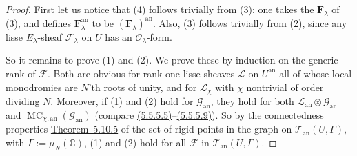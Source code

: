 \begin{proof}
First let us notice that (4) follows trivially from (3): one takes the
\(\mathbf{F}_\lambda\) of (3), and defines \(\mathbf{F}^{\mathrm{an}}_\lambda\)
to be \((\mathbf{F}_\lambda)^{\mathrm{an}}\). Also, (3) follows trivially from
(2), since any lisse \(E_\lambda\)-sheaf \(\mathcal{F}_\lambda\) on \(U\) has
an \(\mathcal{O}_\lambda\)-form.

So it remains to prove (1) and (2). We prove these by induction on the generic
rank of \(\mathcal{F}\). Both are obvious for rank one lisse sheaves
\(\mathcal{L}\) on \(U^{\mathrm{an}}\) all of whose local monodromies are
\(N\)'th roots of unity, and for \(\mathcal{L}_\chi\) with \(\chi\) nontrivial
of order dividing \(N\). Moreover, if (1) and (2) hold for
\(\mathcal{G}_{\mathrm{an}}\), they hold for both
\(\mathcal{L}_{\mathrm{an}}\otimes\mathcal{G}_{\mathrm{an}}\) and
\(\operatorname{MC}_{\chi,\mathrm{an}}(\mathcal{G}_{\mathrm{an}})\) (compare
\hyperref[par:5.5.5.5]{(5.5.5.5)}--\hyperref[par:5.5.5.9]{(5.5.5.9)}). So
by the connectedness properties
\hyperref[thm:5.10.5]{Theorem~5.10.5} of the set of rigid points in the graph
on \(\mathcal{T}_{\mathrm{an}}(U,\Gamma)\), with
\(\Gamma:=\mu_N(\mathbb{C})\), (1) and (2) hold for all \(\mathcal{F}\) in
\(\mathcal{T}_{\mathrm{an}}(U,\Gamma)\).
\end{proof}
